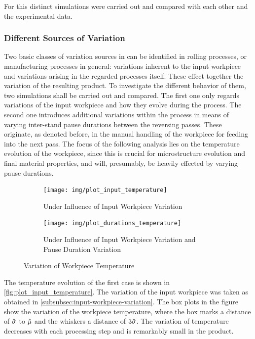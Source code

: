 For this distinct simulations were carried out and compared with each other and the experimental data.

\subsubsection{Different Sources of Variation}\label{subsubsec:different-sources-of-variation}

Two basic classes of variation sources in can be identified in rolling processes, or manufacturing processes in general: variations inherent to the input workpiece and variations arising in the regarded processes itself.
These effect together the variation of the resulting product.
To investigate the different behavior of them, two simulations shall be carried out and compared.
The first one only regards variations of the input workpiece and how they evolve during the process.
The second one introduces additional variations within the process in means of varying inter-stand pause durations between the reversing passes.
These originate, as denoted before, in the manual handling of the workpiece for feeding into the next pass.
The focus of the following analysis lies on the temperature evolution of the workpiece, since this is crucial for microstructure evolution and final material properties, and will, presumably, be heavily effected by varying pause durations.

\begin{figure}
    \begin{subfigure}{\linewidth}
        \centering
        \texttt{[image: img/plot\_input\_temperature]}
        \caption{Under Influence of Input Workpiece Variation}
        \label{fig:plot_input_temperature}
    \end{subfigure}
    \begin{subfigure}{\linewidth}
        \centering
        \texttt{[image: img/plot\_durations\_temperature]}
        \caption{Under Influence of Input Workpiece Variation and Pause Duration Variation}
        \label{fig:plot_durations_temperature}
    \end{subfigure}
    \caption{Variation of Workpiece Temperature}
\end{figure}


The temperature evolution of the first case is shown in \autoref{fig:plot_input_temperature}.
The variation of the input workpiece was taken as obtained in \autoref{subsubsec:input-workpiece-variation}.
The box plots in the figure show the variation of the workpiece temperature, where the box marks a distance of ${\hat{{\sigma}}}$ to ${\hat{{\mu}}}$ and the whiskers a distance of $3{\hat{{\sigma}}}$.
The variation of temperature decreases with each processing step and is remarkably small in the product.

